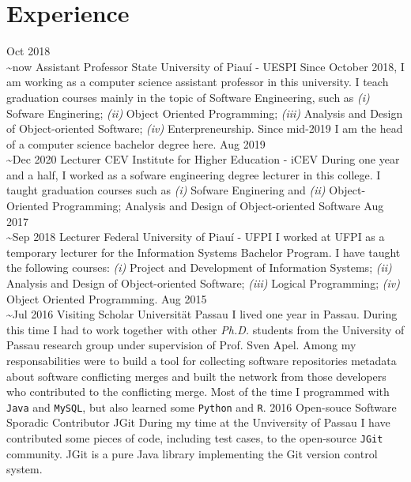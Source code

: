 \documentclass[nocolors]{friggeri-cv-a4}
\begin{document}
\section{Experience}
\begin{entrylist}
	 \entry
	{Oct 2018 \\ \~{}now}
	{Assistant Professor}
	{State University of Piau\'{i} - UESPI}
	{Since October 2018, I am working as a computer science assistant professor in this university. I teach graduation courses mainly in the topic of Software Engineering, such as \textit{(i)} Sofware Enginering; \textit{(ii)} Object Oriented Programming; \textit{(iii)} Analysis and Design of Object-oriented Software; \textit{(iv)} Enterpreneurship. Since mid-2019 I am the head of a computer science bachelor degree here.}
	\entry
	{Aug 2019\\\~{}Dec 2020}
	{Lecturer}
	{CEV Institute for Higher Education - iCEV}
	{During one year and a half, I worked as a sofware engineering degree lecturer in this college. I taught graduation courses such as \textit{(i)} Sofware Enginering and \textit{(ii)} Object-Oriented Programming; Analysis and Design of Object-oriented Software}
	\entry
	{Aug 2017\\\~{}Sep 2018}
	{Lecturer}
	{Federal University of Piau\'{i} - UFPI}
	{I worked at UFPI as a temporary lecturer for the Information Systems Bachelor Program. I have taught the following courses: \textit{(i)} Project and Development of Information Systems; \textit{(ii)} Analysis and Design of Object-oriented Software; \textit{(iii)} Logical Programming; \textit{(iv)} Object Oriented Programming.}
	\entry
	{Aug 2015 \\\~{}Jul 2016}
	{Visiting Scholar}
	{Universit\"at Passau}
	{I lived one year in Passau. During this time I had to work together with other \textit{Ph.D.} students from the University of Passau research group under supervision of Prof. Sven Apel. Among my responsabilities were to build a tool for collecting software repositories metadata about software conflicting merges and built the network from those developers who contributed to the conflicting merge. Most of the time I programmed with \texttt{Java} and \texttt{MySQL}, but also learned some \texttt{Python} and \texttt{R}. }
	\entry
	{2016}
	{Open-souce Software Sporadic Contributor}
	{JGit}
	{During my time at the Unviversity of Passau I have contributed some pieces of code, including test cases, to the open-source \texttt{JGit} community.  JGit is a pure Java library implementing the Git version control system.}
\end{entrylist}
\end{document}
